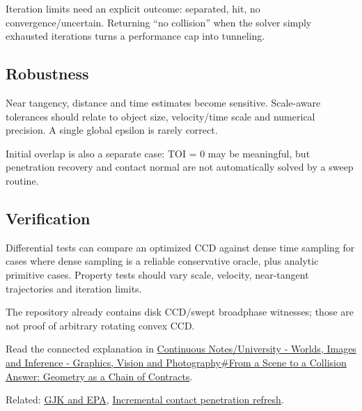 Iteration limits need an explicit outcome: separated, hit, no convergence/uncertain. Returning ``no collision'' when the solver simply exhausted iterations turns a performance cap into tunneling.

\subsection{Robustness}\label{robustness}

Near tangency, distance and time estimates become sensitive. Scale-aware tolerances should relate to object size, velocity/time scale and numerical precision. A single global epsilon is rarely correct.

Initial overlap is also a separate case: TOI = 0 may be meaningful, but penetration recovery and contact normal are not automatically solved by a sweep routine.

\subsection{Verification}\label{verification}

Differential tests can compare an optimized CCD against dense time sampling for cases where dense sampling is a reliable conservative oracle, plus analytic primitive cases. Property tests should vary scale, velocity, near-tangent trajectories and iteration limits.

The repository already contains disk CCD/swept broadphase witnesses; those are not proof of arbitrary rotating convex CCD.

Read the connected explanation in \href{Continuous\%20Notes/University\%20-\%20Worlds,\%20Images\%20and\%20Inference\%20-\%20Graphics,\%20Vision\%20and\%20Photography\#From\%20a\%20Scene\%20to\%20a\%20Collision\%20Answer:\%20Geometry\%20as\%20a\%20Chain\%20of\%20Contracts}{Continuous Notes/University - Worlds, Images and Inference - Graphics, Vision and Photography\#From a Scene to a Collision Answer: Geometry as a Chain of Contracts}.

Related: \hyperref[appendix-aef6177f7b3f]{GJK and EPA}, \hyperref[appendix-f682275acbdf]{Incremental contact penetration refresh}.
